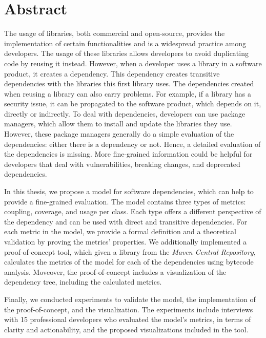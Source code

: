 \chapter*{Abstract}
The usage of libraries, both commercial and open-source, provides the implementation of certain functionalities and is a widespread practice among developers. The usage of these libraries allows developers to avoid duplicating code by reusing it instead. However, when a developer uses a library in a software product, it creates a dependency. This dependency creates transitive dependencies with the libraries this first library uses. The dependencies created when reusing a library can also carry problems. For example, if a library has a security issue, it can be propagated to the software product, which depends on it, directly or indirectly. To deal with dependencies, developers can use package managers, which allow them to install and update the libraries they use. However, these package managers generally do a simple evaluation of the dependencies: either there is a dependency or not. Hence, a detailed evaluation of the dependencies is missing. More fine-grained information could be helpful for developers that deal with vulnerabilities, breaking changes, and deprecated dependencies.

In this thesis, we propose a model for software dependencies, which can help to provide a fine-grained evaluation. The model contains three types of metrics: coupling, coverage, and usage per class. Each type offers a different perspective of the dependency and can be used with direct and transitive dependencies. For each metric in the model, we provide a formal definition and a theoretical validation by proving the metrics' properties. We additionally implemented a proof-of-concept tool, which given a library from the \textit{Maven Central Repository}, calculates the metrics of the model for each of the dependencies using bytecode analysis. Moveover, the proof-of-concept includes a visualization of the dependency tree, including the calculated metrics.

Finally, we conducted experiments to validate the model, the implementation of the proof-of-concept, and the visualization. The experiments include interviews with 15 professional developers who evaluated the model's metrics, in terms of clarity and actionability, and the proposed visualizations included in the tool.
